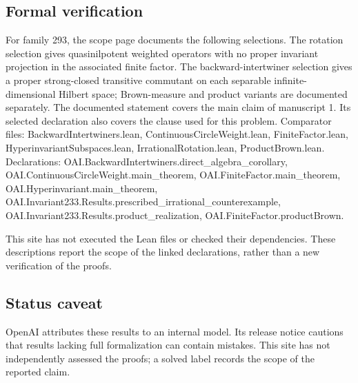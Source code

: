 \documentclass[11pt]{article}
\begin{document}
\subsection{Formal verification}
For family 293, the scope page documents the following selections. The rotation selection gives quasinilpotent weighted operators with no proper invariant projection in the associated finite factor. The backward-intertwiner selection gives a proper strong-closed transitive commutant on each separable infinite-dimensional Hilbert space; Brown-measure and product variants are documented separately. The documented statement covers the main claim of manuscript 1. Its selected declaration also covers the clause used for this problem. Comparator files: BackwardIntertwiners.lean, ContinuousCircleWeight.lean, FiniteFactor.lean, HyperinvariantSubspaces.lean, IrrationalRotation.lean, ProductBrown.lean. Declarations: OAI.BackwardIntertwiners.direct\_algebra\_corollary, OAI.ContinuousCircleWeight.main\_theorem, OAI.FiniteFactor.main\_theorem, OAI.Hyperinvariant.main\_theorem, OAI.Invariant233.Results.prescribed\_irrational\_counterexample, OAI.Invariant233.Results.product\_realization, OAI.FiniteFactor.productBrown.

This site has not executed the Lean files or checked their dependencies. These descriptions report the scope of the linked declarations, rather than a new verification of the proofs.

\subsection{Status caveat}
OpenAI attributes these results to an internal model. Its release notice cautions that results lacking full formalization can contain mistakes. This site has not independently assessed the proofs; a solved label records the scope of the reported claim.
\end{document}
